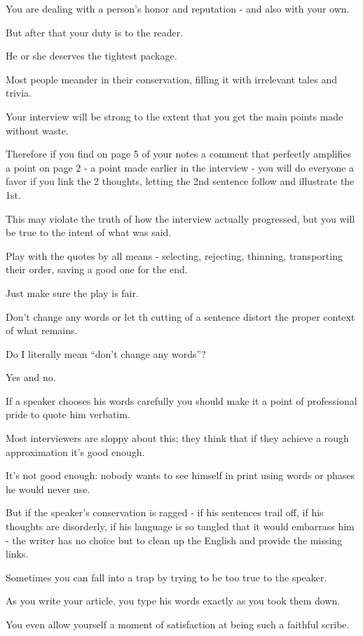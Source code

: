 \documentclass{book}
\numberwithin{equation}{section}
\begin{document}
You are dealing with a person's honor and reputation - and also with your own.

%
But after that your duty is to the reader.

He or she deserves the tightest package.

Most people meander in their conservation, filling it with irrelevant tales and trivia.

Your interview will be strong to the extent that you get the main points made without waste.

Therefore if you find on page 5 of your notes a comment that perfectly amplifies a point on page 2 - a point made earlier in the interview - you will do everyone a favor if you link the 2 thoughts, letting the 2nd sentence follow and illustrate the 1st.

This may violate the truth of how the interview actually progressed, but you will be true to the intent of what was said.

Play with the quotes by all means - selecting, rejecting, thinning, transporting their order, saving a good one for the end.

Just make sure the play is fair.

Don't change any words or let th cutting of a sentence distort the proper context of what remains.

%
Do I literally mean ``don't change any words''?

Yes and no.

If a speaker chooses his words carefully you should make it a point of professional pride to quote him verbatim.

Most interviewers are sloppy about this; they think that if they achieve a rough approximation it's good enough.

It's not good enough: nobody wants to see himself in print using words or phases he would never use.

But if the speaker's conservation is ragged - if his sentences trail off, if his thoughts are disorderly, if his language is so tangled that it would embarrass him - the writer has no choice but to clean up the English and provide the missing links.

%
Sometimes you can fall into a trap by trying to be too true to the speaker.

As you write your article, you type his words exactly as you took them down.

You even allow yourself a moment of satisfaction at being such a faithful scribe.
\end{document}

